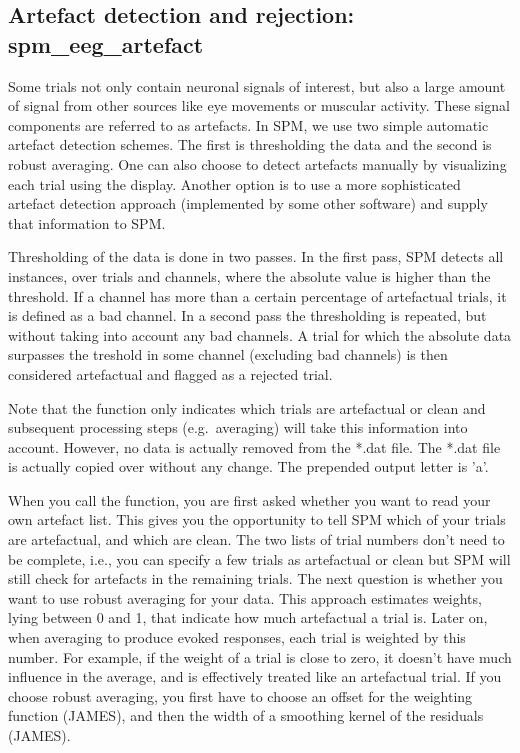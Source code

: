 \subsection{Artefact detection and rejection: spm\_eeg\_artefact}
Some trials not only contain neuronal signals of
interest, but also a large amount of signal from other sources like
eye movements or muscular activity. These signal components are
referred to as artefacts. In SPM, we use two simple automatic
artefact detection schemes. The first is thresholding the data and the
second is robust averaging. One can also choose to detect artefacts
manually by visualizing each trial using the display. Another option
is to use a more sophisticated artefact detection approach
(implemented by some other software) and supply that information to
SPM. 

Thresholding of the data is done in two passes. In the first pass, SPM
detects all instances, over trials and channels, where the
absolute value is higher than the threshold. If a channel has more
than a certain percentage of artefactual trials, it is defined as a
bad channel. In a second pass the thresholding is repeated, but
without taking into account any bad channels. A trial for which the
absolute data surpasses the treshold in some channel (excluding bad
channels) is then considered artefactual and flagged as a rejected
trial.

Note that the function only indicates which trials are artefactual or
clean and subsequent processing steps (e.g.~averaging) will take this 
information into account. However, no data is actually removed from
the *.dat file. The *.dat file is actually copied over without any
change. The prepended output letter is 'a'.

When you call the function, you are first asked whether you want
to read your own artefact list. This gives you the opportunity to 
tell SPM which of your trials are artefactual, and which are clean. 
The two lists of trial numbers don't need to be complete, i.e., you can specify a
few trials as artefactual or clean but SPM will still check for artefacts in the remaining trials.
The next question is whether you want to use robust averaging for your data.
This approach estimates weights, lying between 0 and 1, that indicate how much 
artefactual a trial is. Later on, when averaging to produce evoked responses, 
each trial is weighted by this number. For example, if the weight of 
a trial is close to zero, it doesn't have much influence in the average, 
and is effectively treated like an artefactual trial. If you choose robust 
averaging, you first have to choose an offset for the weighting function
(JAMES), and then the width of a smoothing kernel of the residuals (JAMES).

